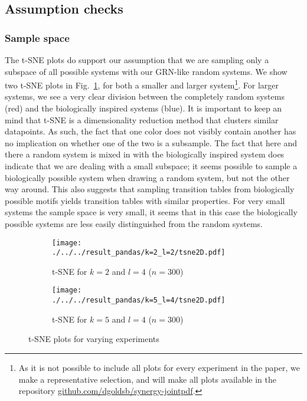 \documentclass[../main.tex]{subfiles}
\begin{document}

\subsection{Assumption checks}

\subsubsection{Sample space}

The t-SNE plots do support our assumption that we are sampling only a subspace of all possible systems with our GRN-like random systems.
We show two t-SNE plots in Fig.~\ref{fig:TSNE}, for both a smaller and larger system\footnote{As it is not possible to include all plots for every experiment in the paper, we make a representative selection, and will make all plots available in the repository \url{github.com/dgoldsb/synergy-jointpdf}.}.
For larger systems, we see a very clear division between the completely random systems (red) and the biologically inspired systems (blue).
It is important to keep an mind that t-SNE is a dimensionality reduction method that clusters similar datapoints.
As such, the fact that one color does not visibly contain another has no implication on whether one of the two is a subsample.
The fact that here and there a random system is mixed in with the biologically inspired system does indicate that we are dealing with a small subspace; it seems possible to sample a biologically possible system when drawing a random system, but not the other way around.
This also suggests that sampling transition tables from biologically possible motifs yields transition tables with similar properties.
For very small systems the sample space is very small, it seems that in this case the biologically possible systems are less easily distinguished from the random systems.

\begin{figure}[H]
    \centering
    \begin{subfigure}[b]{0.4\textwidth}
        \texttt{[image: ./../../result\_pandas/k=2\_l=2/tsne2D.pdf]}
        \caption{t-SNE for $k=2$ and $l=4$ ($n=300$)}
    \end{subfigure}
    \begin{subfigure}[b]{0.4\textwidth}
        \texttt{[image: ./../../result\_pandas/k=5\_l=4/tsne2D.pdf]}
        \caption{t-SNE for $k=5$ and $l=4$ ($n=300$)}
    \end{subfigure}
    \caption{t-SNE plots for varying experiments}
    \label{fig:TSNE}
\end{figure}
\end{document}

